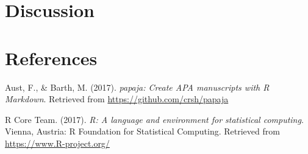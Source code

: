 \documentclass[man]{apa6}
\theoremstyle{definition}
\theoremstyle{definition}
\theoremstyle{definition}
\theoremstyle{remark}
\begin{document}
\section{Discussion}\label{discussion}

\newpage

\section*{References}\label{references}

\hypertarget{refs}{}
\hypertarget{ref-R-papaja}{}
Aust, F., \& Barth, M. (2017). \emph{papaja: Create APA manuscripts with
R Markdown}. Retrieved from \url{https://github.com/crsh/papaja}

\hypertarget{ref-R-base}{}
R Core Team. (2017). \emph{R: A language and environment for statistical
computing}. Vienna, Austria: R Foundation for Statistical Computing.
Retrieved from \url{https://www.R-project.org/}
\end{document}
